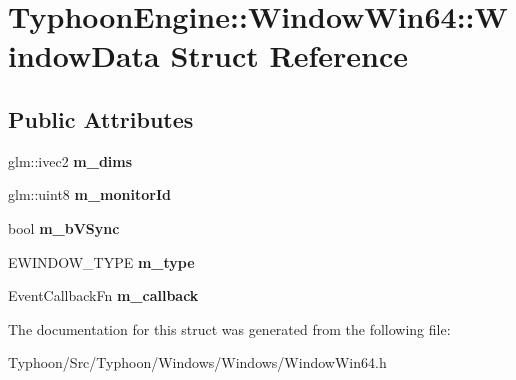 \hypertarget{struct_typhoon_engine_1_1_window_win64_1_1_window_data}{}\section{Typhoon\+Engine\+::Window\+Win64\+::Window\+Data Struct Reference}
\label{struct_typhoon_engine_1_1_window_win64_1_1_window_data}
\subsection*{Public Attributes}
\begin{DoxyCompactItemize}
\item 
\mbox{\label{struct_typhoon_engine_1_1_window_win64_1_1_window_data_a9c8632317c6cc01c16763b50a381983e}} 
glm\+::ivec2 {\bfseries m\+\_\+dims}
\item 
\mbox{\label{struct_typhoon_engine_1_1_window_win64_1_1_window_data_abaecf3e0d2be31ed766209f0fbc8bada}} 
glm\+::uint8 {\bfseries m\+\_\+monitor\+Id}
\item 
\mbox{\label{struct_typhoon_engine_1_1_window_win64_1_1_window_data_a414373809943d5a3647cc58c952eb937}} 
bool {\bfseries m\+\_\+b\+V\+Sync}
\item 
\mbox{\label{struct_typhoon_engine_1_1_window_win64_1_1_window_data_a1b26a569385cc9c14f3bb9218a44475a}} 
E\+W\+I\+N\+D\+O\+W\+\_\+\+T\+Y\+PE {\bfseries m\+\_\+type}
\item 
\mbox{\label{struct_typhoon_engine_1_1_window_win64_1_1_window_data_a67cf8b6356b405fae45f804ac24aea71}} 
Event\+Callback\+Fn {\bfseries m\+\_\+callback}
\end{DoxyCompactItemize}


The documentation for this struct was generated from the following file\+:\begin{DoxyCompactItemize}
\item 
Typhoon/\+Src/\+Typhoon/\+Windows/\+Windows/Window\+Win64.\+h\end{DoxyCompactItemize}
